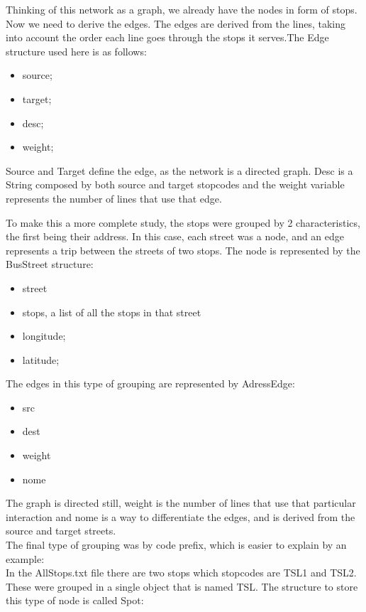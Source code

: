 \documentclass[12pt]{article}
\begin{document}
\begin{multicols}{2}
Thinking of this network as a graph, we already have the nodes in form of stops. Now we need to derive the edges. The edges are derived from the lines, taking into account the order each line goes through the stops it serves.The Edge structure used here is as follows:

\begin{itemize}
	\item source;
	\item target;
	\item desc;
	\item weight;
\end{itemize}

Source and Target define the edge, as the network is a directed graph. Desc is a String composed by both source and target stopcodes and the weight variable represents the number of lines that use that edge. 

To make this a more complete study, the stops were grouped by 2 characteristics, the first being their address. In this case, each street was a node, and an edge represents a trip between the streets of two stops. The node is represented by the BusStreet structure:

\begin{itemize}
	\item street
	\item stops, a list of all the stops in that street
	\item longitude;
	\item latitude;
\end{itemize}

The edges in this type of grouping are represented by AdressEdge:
	
\begin{itemize}
	\item src
	\item dest
	\item weight
	\item nome
\end{itemize}
	
The graph is directed still, weight is the number of lines that use that particular interaction and nome is a way to differentiate the edges, and is derived from the source and target streets.\\

The final type of grouping was by code prefix, which is easier to explain by an example:\\
In the AllStops.txt file there are two stops which stopcodes are TSL1 and TSL2. These were grouped in a single object that is named TSL. The structure to store this type of node is called Spot:


\end{multicols}
\end{document}

